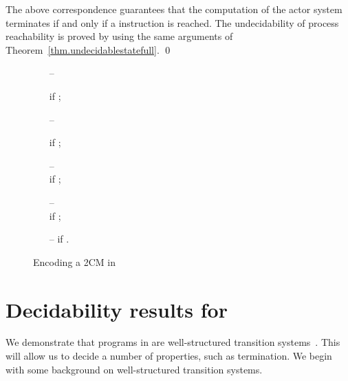 \documentclass{LMCS}
\theoremstyle{plain}\newtheorem{proposition}[thm]{Proposition}
\theoremstyle{plain}\newtheorem{lemma}[thm]{Lemma}
\theoremstyle{plain}\newtheorem{theorem}[thm]{Theorem}
\theoremstyle{plain}\newtheorem{corollary}[thm]{Corollary}
\newif\iftype \typefalse
\newcommand{\actro}{}
\newcommand{\actroba}{}
\begin{document}
The above correspondence guarantees that the 
computation of the actor system
terminates if and only if 
a  instruction is reached.
The undecidability of process reachability
is proved by using the same arguments
of Theorem~\ref{thm.undecidablestatefull}.
\qed
\fi

\begin{figure}[t]
\iftype
\begin{lstlisting}[frame=single]
actor  {
	fields { dec }
	method one() = ( [dec = ]   one()  skip )  dec  
	method inc(pc) =   one()  Ctrl  run(pc)
	method decJump(pc, pc') = 
		dec      checkZero(pc, pc')
	method checkZero(pc, pc') =
		[dec = ] Ctrl  run(pc')  Ctrl  run(pc)
	method init() = dec  
}
actor Ctrl {
	method run(pc) =
		[pc = 1]  
		. . . 
		[pc = n]   
	method init() =   init()    init()  Ctrl  run(1)
}
\end{lstlisting}
\else


\bigskip

\begin{itemize}[label=--]
\item[--]

\qquad if 
;

\medskip

\item[--]

\qquad if 
;

\medskip

\item[--]
 \\
\hfill
if  ;

\medskip

\item[--]
\\
\hfill
if  ;

\medskip

\item[--]
 \qquad if 
.
\end{itemize}\medskip

\fi
\caption{Encoding a 2CM in {\actro}}\label{fig:2CM_actor2}
\end{figure}


\section{Decidability results for {\actroba}}
\label{sec.decidability}




We demonstrate that programs in {\actroba}
are well-structured transition systems~\cite{abdulla:96,Finkel:2001}.  This
will allow us to decide a number of properties, such as termination.
We begin with some background on well-structured transition systems.
\end{document}
